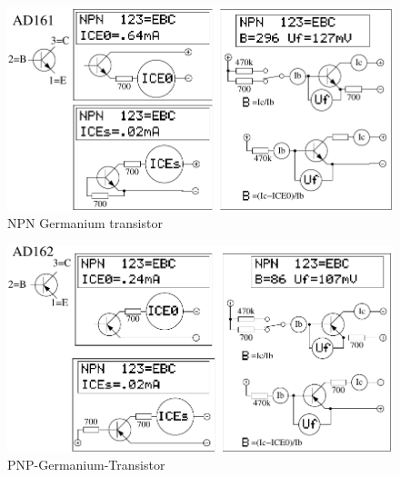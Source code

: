 \begin{figure}[H]
\centering
\includegraphics[]{../FIG/BJT_AD161.pdf}
\caption{NPN Germanium transistor}
\label{fig:BJT-NPN-Ge}
\end{figure}


\begin{figure}[H]
\centering
\includegraphics[]{../FIG/BJT_AD162.pdf}
\caption{PNP-Germanium-Transistor}
\label{fig:BJT-PNP-Ge}
\end{figure}

